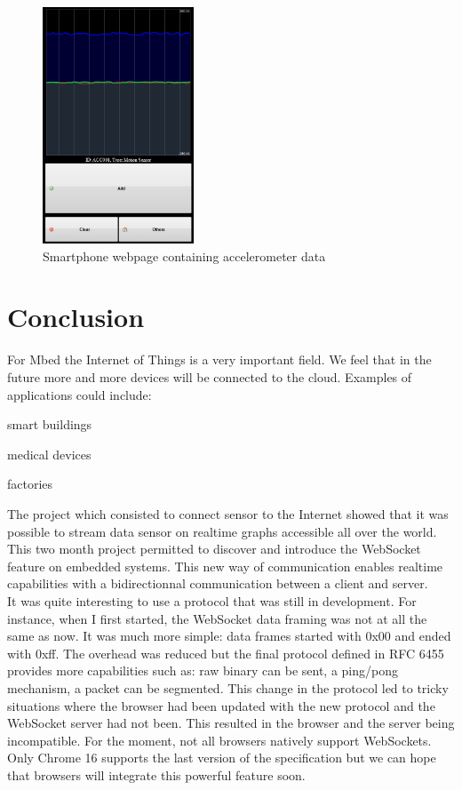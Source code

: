 \documentclass[pdftex,10pt,a4paper]{report}
\newenvironment{packed_item}{
\begin{itemize}
  \setlength{\itemsep}{1pt}
  \setlength{\parskip}{0pt}
  \setlength{\parsep}{0pt}
}{\end{itemize}}
\begin{document}
\begin{figure}[h!]
		\centering
		\includegraphics[width=0.4\textwidth]{./mobile_web_acc.jpg}
		\caption{Smartphone webpage containing accelerometer data}
		\label{Smartphone webpage containing accelerometer data}
\end{figure}

\section{Conclusion}
For Mbed the Internet of Things is a very important field. We feel that in the future more and more devices will be connected to the cloud. Examples of applications could include:
\begin{packed_item}
	\item smart buildings
	\item medical devices
	\item factories
\end{packed_item}

The project which consisted to connect sensor to the Internet showed that it was possible to stream data sensor on realtime graphs accessible all over the world. This two month project permitted to discover and introduce the WebSocket feature on embedded systems. This new way of communication enables realtime capabilities with a bidirectionnal communication between a client and server. \\

It was quite interesting to use a protocol that was still in development. For instance, when I first started, the WebSocket data framing was not at all the same as now. It was much more simple: data frames started with 0x00 and ended with 0xff. The overhead was reduced but the final protocol defined in RFC 6455 provides more capabilities such as: raw binary can be sent, a ping/pong mechanism, a packet can be segmented. This change in the protocol led to tricky situations where the browser had been updated with the new protocol and the WebSocket server had not been. This resulted in the browser and the server being incompatible. For the moment, not all browsers natively support WebSockets. Only Chrome 16 supports the last version of the specification but we can hope that browsers will integrate this powerful feature soon.\\
\end{document}
